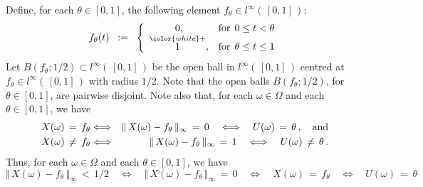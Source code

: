 \proof
Define, for each $\theta \in [0,1]$, the following element $f_{\theta} \in l^{\infty}(\,[0,1]\,)$:
\begin{equation*}
f_{\theta}(t)
\;\; := \;\;
	\left\{\begin{array}{cc}
	0, & \textnormal{for} \;\, 0 \leq t < \theta
	\\
	\overset{{\color{white}+}}{1}, & \textnormal{for} \;\, \theta \leq t \leq 1
	\end{array}\right.
\end{equation*}
Let $B(f_{\theta};1/2) \subset l^{\infty}(\,[0,1]\,)$ be the open ball in $l^{\infty}(\,[0,1]\,)$
centred at $f_{\theta} \in l^{\infty}(\,[0,1]\,)$ with radius $1/2$.
Note that the open balls $B(f_{\theta};1/2)$, for $\theta \in [0,1]$, are pairwise disjoint.
Note also that, for each $\omega \in \Omega$ and each $\theta \in [0,1]$, we have
\begin{eqnarray*}
X(\omega) \,=\, f_{\theta}
&\Longleftrightarrow& \Vert\, X(\omega) - f_{\theta}\,\Vert_{\infty} \,=\, 0
	\quad\Longleftrightarrow\quad U(\omega) \,=\, \theta\,, \quad\textnormal{and}
\\
X(\omega) \,\neq\, f_{\theta}
&\Longleftrightarrow& \Vert\, X(\omega) - f_{\theta}\,\Vert_{\infty} \,=\, 1
	\quad\Longleftrightarrow\quad U(\omega) \,\neq\, \theta\,.
\end{eqnarray*}
Thus, for each $\omega \in \Omega$ and each $\theta \in [0,1]$, we have
\begin{equation*}
\Vert\, X(\omega) - f_{\theta}\,\Vert_{\infty} \,<\, 1/2
\quad\Longleftrightarrow\quad
	\Vert\, X(\omega) - f_{\theta}\,\Vert_{\infty} \,=\, 0
\quad\Longleftrightarrow\quad
	X(\omega) \,=\, f_{\theta}
\quad\Longleftrightarrow\quad
	U(\omega) \,=\, \theta
\end{equation*}


